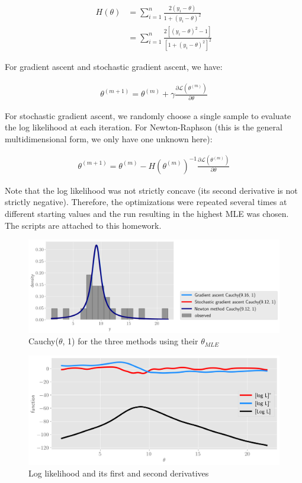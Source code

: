 \documentclass[11pt]{article}
\begin{document}
\begin{align*} H(\theta) &=\sum_{i=1}^n   \frac{2(y_i-\theta)}{1+(y_i-\theta)^2} \\
&=  \sum_{i=1}^n   \frac{2[(y_i-\theta)^2-1]}{[1+(y_i-\theta)^2]^2} \end{align*}

For gradient ascent and stochastic gradient ascent, we have:

\begin{align*}
    \theta^{(m+1)} = \theta^{(m)} + \gamma \frac{\partial \mathcal{L}(\theta^{(m)})}{\partial \theta}
\end{align*}

For stochastic gradient ascent, we randomly choose a single sample to evaluate the log likelihood at each iteration. For Newton-Raphson (this is the general multidimensional form, we only have one unknown here):

\begin{align*}
    \theta^{(m+1)} = \theta^{(m)} - H(\theta^{(m)})^{-1} \frac{\partial \mathcal{L}(\theta^{(m)})}{\partial \theta}
\end{align*}

Note that the log likelihood was not strictly concave (its second derivative is not strictly negative). Therefore, the optimizations were repeated several times at different starting values and the run resulting in the highest MLE was chosen. The scripts are attached to this homework.

\begin{figure}[!h]
    \centering
    \includegraphics[scale=.55]{homework_2/figures/mle_cauchy.png}
    \caption{Cauchy($\theta$, 1) for the three methods using their $\theta_{MLE}$}
    \label{fig:my_label}
\end{figure}

\begin{figure}[!h]
    \centering
    \includegraphics[scale=.55]{homework_2/figures/cauchy_fns.png}
    \caption{Log likelihood and its first and second derivatives}
    \label{fig:my_label}
\end{figure}
\end{document}
